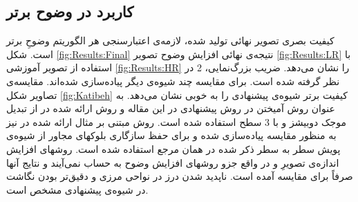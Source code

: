 \documentclass[11pt,a4paper,twocolumn]{article}
\newcommand{\SR}{وضوحِ برتر }%
\newcommand{\fusion}{آمیختن }
\begin{document}
\subsection{کاربرد در وضوح برتر}
کیفیت بصری تصویر نهائی تولید شده، لازمه‌ی اعتبارسنجی هر الگوریتم \SR است. 
شکل \ref{fig:Results:Final} نتیجه‌ی نهائی افزایش وضوح تصویر \ref{fig:Results:LR} با استفاده از تصویر آموزشی \ref{fig:Results:HR} را
 نشان می‌دهد. ضریب بزرگ‌نمایی، 2 در نظر گرفته شده است. 
برای مقایسه‌ چند شیوه‌ی دیگر پیاده‌سازی شده‌اند. مقایسه‌ی تصاویر شکل \ref{fig:Katibeh} کیفیت برتر شیوه‌ی پیشنهادی را به خوبی نشان می‌دهد. به عنوان روش \fusion در روش پیشنهادی در این مقاله و روش ارائه شده در \cite{Amintoosi08reconstruction} از تبدیل موجک دوبیشز%
 و با 3 سطح استفاده شده است. روش مبتنی بر مثال ارائه شده در \cite{Freeman02example} نیز به منظور مقایسه پیاده‌سازی شده و برای حفظ سازگاری بلوکهای مجاور از شیوه‌ی پویش سطر به سطر ذکر شده در همان مرجع استفاده شده است. روشهای افزایش اندازه‌ی تصویرِ  و  در واقع جزو روشهای افزایش وضوح به حساب نمی‌آیند و نتایج آنها صرفاً برای مقایسه آمده است. ناپدید شدن درز در نواحی مرزی و دقیق‌تر بودن نگاشت در شیوه‌ی پیشنهادی مشخص است.
\end{document}
